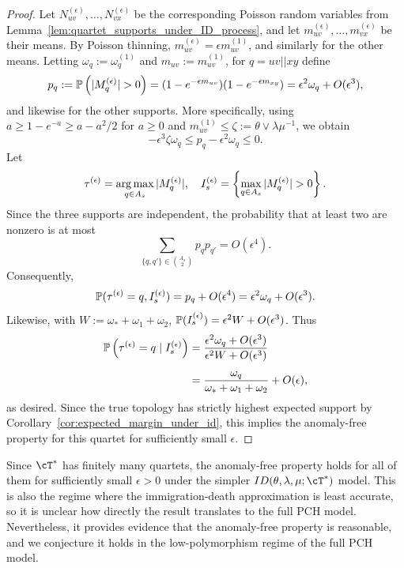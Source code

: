 \begin{proof}
    Let $N_{uv}^{(\epsilon)},\ldots,N_{vx}^{(\epsilon)}$ be the corresponding Poisson random variables from
    Lemma~\ref{lem:quartet_supports_under_ID_process}, and let
    $m_{uv}^{(\epsilon)},\ldots,m_{vx}^{(\epsilon)}$ be their means.
    By Poisson thinning, $m_{uv}^{(\epsilon)} = \epsilon m_{uv}^{(1)}$, and similarly for the other means.
    Letting $\omega_q := \omega_q^{(1)}$ and $m_{uv} := m_{uv}^{(1)}$, for $q = uv||xy$ define
    \[p_{q} := \P\left(|M_{q}^{(\epsilon)}| > 0\right) = (1-e^{-\epsilon m_{uv}})(1-e^{-\epsilon m_{xy}}) = \epsilon^2 \omega_{q} + O(\epsilon^3),\]
    \noindent and likewise for the other supports. More specifically, using
    $a \geq 1-e^{-a} \geq a-a^2/2$ for $a\geq0$ and
    $m_{uv}^{(1)} \leq \zeta := \theta \vee \lambda \mu^{-1}$, we obtain
    \[-\epsilon^3 \zeta \omega_q \leq p_q -\epsilon^2 \omega_q \leq 0.\]
    Let
    \[\tau^{(\epsilon)} = \argmax_{q \in A_s} |M^{(\epsilon)}_q|, \quad I_s^{(\epsilon)} = \left\{\max_{q \in A_s} |M^{(\epsilon)}_q| > 0\right\}.\]
    \noindent Since the three supports are independent, the probability that at least two
    are nonzero is at most
    \[\sum_{\{q,q'\}\in\binom{A_s}{2}}p_q p_{q'}=O(\epsilon^4).\]
    Consequently,
    \[\P(\tau^{(\epsilon)}=q,I_s^{(\epsilon)})=p_q+O(\epsilon^4)
    =\epsilon^2\omega_q+O(\epsilon^3).\]
    \noindent Likewise, with $W:=\omega_*+\omega_1+\omega_2$,
    $\P(I_s^{(\epsilon)})=\epsilon^2W+O(\epsilon^3)$. Thus
    \begin{align*}
         \P\left(\tau^{(\epsilon)} = q \mid I_s^{(\epsilon)} \right)
         &=\frac{\epsilon^2\omega_q+O(\epsilon^3)}{\epsilon^2W+O(\epsilon^3)}\\[5pt]
         &=\frac{\omega_q}{\omega_*+\omega_1+\omega_2}+O(\epsilon),
    \end{align*}
    \noindent as desired. Since the true topology has strictly highest expected support by
    Corollary~\ref{cor:expected_margin_under_id}, this implies the anomaly-free property for this quartet for sufficiently small $\epsilon$.
\end{proof}

Since $\cT^*$ has finitely many quartets, the anomaly-free property holds for all of them
for sufficiently small $\epsilon>0$ under the simpler
$ID(\theta, \lambda, \mu; \cT^*)$ model. This is also the regime where the immigration-death
approximation is least accurate, so it is unclear how directly the result translates to the full PCH model.
Nevertheless, it provides evidence that the anomaly-free property is reasonable, and we conjecture it
holds in the low-polymorphism regime of the full PCH model.

